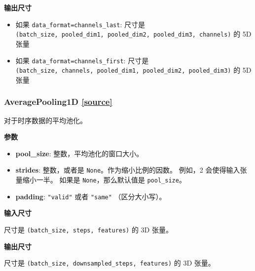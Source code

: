 \textbf{输出尺寸}

\begin{itemize}
\tightlist
\item
  如果
  \texttt{data\_format=\textquotesingle{}channels\_last\textquotesingle{}}:
  尺寸是
  \texttt{(batch\_size,\ pooled\_dim1,\ pooled\_dim2,\ pooled\_dim3,\ channels)}
  的 5D 张量
\item
  如果
  \texttt{data\_format=\textquotesingle{}channels\_first\textquotesingle{}}:
  尺寸是
  \texttt{(batch\_size,\ channels,\ pooled\_dim1,\ pooled\_dim2,\ pooled\_dim3)}
  的 5D 张量
\end{itemize}



\subsubsection{AveragePooling1D  {\href{https://github.com/keras-team/keras/blob/master/keras/layers/pooling.py\#L87}{{[}source{]}}}}

\begin{Shaded}
\begin{Highlighting}[]
\OperatorTok{=}\OperatorTok{=}\OperatorTok{=}\NormalTok{)}
\end{Highlighting}
\end{Shaded}

对于时序数据的平均池化。

\textbf{参数}

\begin{itemize}
\tightlist
\item
  \textbf{pool\_size}: 整数，平均池化的窗口大小。
\item
  \textbf{strides}: 整数，或者是 \texttt{None}。作为缩小比例的因数。
  例如，2 会使得输入张量缩小一半。 如果是 \texttt{None}，那么默认值是
  \texttt{pool\_size}。
\item
  \textbf{padding}: \texttt{"valid"} 或者 \texttt{"same"}
  （区分大小写）。
\end{itemize}

\textbf{输入尺寸}

尺寸是 \texttt{(batch\_size,\ steps,\ features)} 的 3D 张量。

\textbf{输出尺寸}

尺寸是 \texttt{(batch\_size,\ downsampled\_steps,\ features)} 的 3D
张量。




